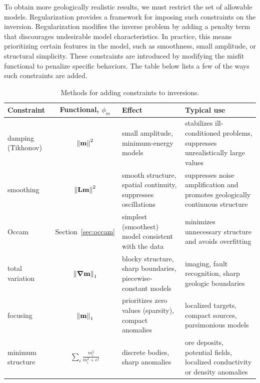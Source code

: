 To obtain more geologically realistic results, we must restrict the set of allowable models. Regularization provides a framework for imposing such constraints on the inversion.  Regularization modifies the inverse problem by adding a penalty term that discourages undesirable model characteristics. In practice, this means prioritizing certain features in the model, such as smoothness, small amplitude, or structural simplicity. These constraints are introduced by modifying the misfit functional to penalize specific behaviors.  The table below lists a few of the ways such constraints are added.
\begin{table}
    \centering
    \caption{Methods for adding constraints to inversions.}
    \label{tab:regularization}
    \begin{tabularx}{\textwidth}{@{}lcXX@{}}
        \toprule
        \textbf{Constraint} &
        \textbf{Functional}, $\phi_m$ &
        \textbf{Effect} &
        \textbf{Typical use} \\
        \midrule
        damping (Tikhonov) &
        $\norm{\vb{m}}^2$ &
        small amplitude, minimum-energy models &
        stabilizes ill-conditioned problems, suppresses unrealistically large values \\

        smoothing &
        $\norm{\vb{L}\vb{m}}^2$ &
        smooth structure, spatial continuity, suppresses oscillations &
        suppresses noise amplification and promotes geologically continuous structure \\

        Occam &
        Section~\ref{sec:occam} &
        simplest (smoothest) model consistent with the data &
        minimizes unnecessary structure and avoids overfitting \\

        total variation &
        $\norm{\grad{\vb{m}}}_1$ &
        blocky structure, sharp boundaries, piecewise-constant models &
        imaging, fault recognition, sharp geologic boundaries \\

        focusing &
        $\norm{\vb{m}}_1$ &
        prioritizes zero values (sparsity), compact anomalies &
        localized targets, compact sources, parsimonious models \\

        minimum structure &
        $\sum_i \frac{m_i^2}{m_i^2 + \epsilon^2}$ &
        discrete bodies, sharp anomalies &
        ore deposits, potential fields, localized conductivity or density anomalies \\


\end{tabularx}
\end{table}
